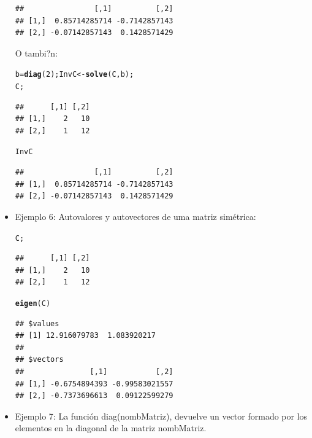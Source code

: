 \documentclass[12pt,letterpaper]{article}\usepackage[]{graphicx}\usepackage[]{color}
\makeatletter
\newcommand{\hlnum}[1]{\textcolor[rgb]{0.686,0.059,0.569}{#1}}%
\newcommand{\hlstd}[1]{\textcolor[rgb]{0.345,0.345,0.345}{#1}}%
\newcommand{\hlkwb}[1]{\textcolor[rgb]{0.69,0.353,0.396}{#1}}%
\newcommand{\hlkwd}[1]{\textcolor[rgb]{0.737,0.353,0.396}{\textbf{#1}}}%
\newenvironment{kframe}{%
 \def\at@end@of@kframe{}%
 \ifinner\ifhmode%
  \def\at@end@of@kframe{\end{minipage}}%
  \begin{minipage}{\columnwidth}%
 \fi\fi%
 \def\FrameCommand##1{\hskip\@totalleftmargin \hskip-\fboxsep
 \colorbox{shadecolor}{##1}\hskip-\fboxsep
     \hskip-\linewidth \hskip-\@totalleftmargin \hskip\columnwidth}%
 \MakeFramed {\advance\hsize-\width
   \@totalleftmargin\z@ \linewidth\hsize
   \@setminipage}}%
 {\par\unskip\endMakeFramed%
 \at@end@of@kframe}
\newenvironment{knitrout}{}{} %
\makeatother
\begin{document}
\begin{itemize}
\begin{knitrout}
\begin{kframe}
\begin{verbatim}
##                [,1]          [,2]
## [1,]  0.85714285714 -0.7142857143
## [2,] -0.07142857143  0.1428571429
\end{verbatim}
\end{kframe}
\end{knitrout}
O tambi?n:
\begin{knitrout}
\color{fgcolor}\begin{kframe}
\begin{alltt}
\hlstd{b}\hlkwb{=}\hlkwd{diag}\hlstd{(}\hlnum{2}\hlstd{); InvC}\hlkwb{<-}\hlkwd{solve}\hlstd{(C, b);}
\hlstd{C;}
\end{alltt}
\begin{verbatim}
##      [,1] [,2]
## [1,]    2   10
## [2,]    1   12
\end{verbatim}
\begin{alltt}
\hlstd{InvC}
\end{alltt}
\begin{verbatim}
##                [,1]          [,2]
## [1,]  0.85714285714 -0.7142857143
## [2,] -0.07142857143  0.1428571429
\end{verbatim}
\end{kframe}
\end{knitrout}
\item Ejemplo 6: Autovalores y autovectores de uma matriz sim\'etrica:
\begin{knitrout}
\color{fgcolor}\begin{kframe}
\begin{alltt}
\hlstd{C;}
\end{alltt}
\begin{verbatim}
##      [,1] [,2]
## [1,]    2   10
## [2,]    1   12
\end{verbatim}
\begin{alltt}
\hlkwd{eigen}\hlstd{(C)}
\end{alltt}
\begin{verbatim}
## $values
## [1] 12.916079783  1.083920217
## 
## $vectors
##               [,1]           [,2]
## [1,] -0.6754894393 -0.99583021557
## [2,] -0.7373696613  0.09122599279
\end{verbatim}
\end{kframe}
\end{knitrout}
\item Ejemplo 7: La funci\'on diag(nombMatriz), devuelve un vector formado por los elementos en la
diagonal de la matriz nombMatriz.
\begin{knitrout}

\end{knitrout}
\end{itemize}
\end{document}
